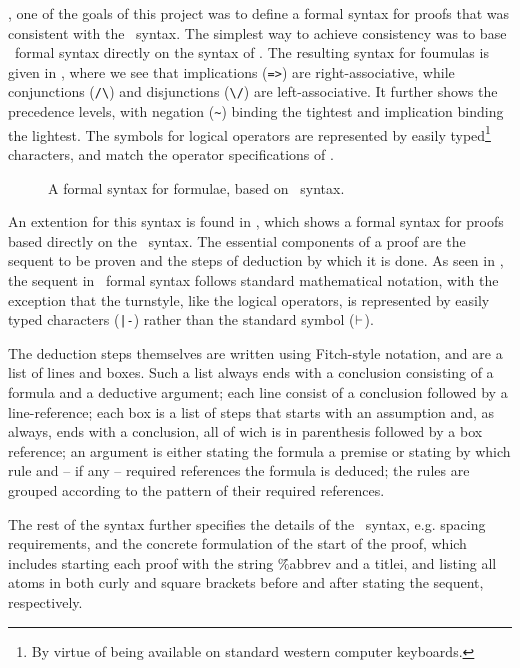 \documentclass[BA.tex]{subfiles}
\begin{document}
, one of the goals of this project
 was to define a formal syntax for proofs that was consistent with the
 \bp\ syntax\cite{boxhelp}. The simplest way to achieve consistency
 was to base \our\ formal syntax directly on the syntax of \bp.
 The resulting syntax for foumulas is given in , where we see
 that implications (\verb+=>+) are right-associative, while conjunctions 
 (\verb+/\+) and disjunctions (\verb+\/+) are left-associative. It further
 shows the precedence levels, with negation (\verb+~+) binding the tightest
 and implication binding the lightest. The symbols for logical operators are
 represented by easily typed\footnote{By virtue of being available on 
 standard western computer keyboards.} characters, and match the
 operator specifications of \bp.

\begin{figure}[t]

\caption{A formal syntax for formulae, based on \bp\ syntax.}
\label{fform}
\end{figure}

 An extention for this syntax is found in , which shows a formal
 syntax for proofs based directly on the \bp\ syntax.
 The essential components of a proof are the sequent to be
 proven and the steps of deduction by which it is done. 
 As seen in , the sequent in \our\ formal syntax
 follows standard mathematical notation, with the exception that the
 turnstyle, like the  logical operators, is represented by
 easily typed characters (\verb+|-+) rather than the standard symbol 
 (\(\vdash\)).
 
 The deduction steps themselves are written using 
 Fitch-style notation\cite{boxhelp},
 and are a list of lines and boxes. Such a list always ends with a 
 conclusion consisting of a formula
 and a deductive argument; each line consist of a conclusion followed 
 by a line-reference; each box is a list of steps that starts with an 
 assumption and, as always, ends with a conclusion, all of wich is in
 parenthesis followed by a box reference; an argument is either stating
 the formula a premise or stating by which rule and -- if any -- required 
 references the formula is deduced; the rules are grouped according to the
 pattern of their required references. 
 
 The rest of the syntax further 
 specifies the details of the \bp\ syntax, e.g. spacing requirements, and
 the concrete formulation of the start of the proof, which includes starting
 each proof with the string \f{\%abbrev} and a titlei, and listing all atoms
 in both curly and square
 brackets before and after stating the sequent, respectively.
\end{document}
